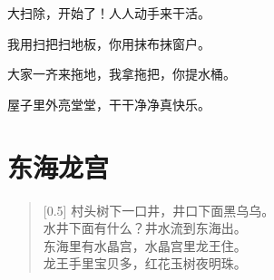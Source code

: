 \documentclass[12pt,UTF-8,openany]{ctexbook}
\begin{document}
\begin{large}
    
    大扫除，开始了！人人动手来干活。
    
    我用扫把扫地板，你用抹布抹窗户。
    
    大家一齐来拖地，我拿拖把，你提水桶。
    
    屋子里外亮堂堂，干干净净真快乐。
    
\end{large}


\clearpage

\begin{center}
    
    
\end{center}


\hanzibox{}\hanzibox{}\hanzibox{}\hanzibox{}\hspace{1em}\hanzibox{}\hanzibox{}\hanzibox{}\hanzibox{}

\hanzibox{}\hanzibox{}\hanzibox{}\hanzibox{}\hspace{1em}\hanzibox{}\hanzibox{}\hanzibox{}\hanzibox{}

\hanzibox{}\hanzibox{}\hanzibox{}\hanzibox{}\hspace{1em}\hanzibox{}\hanzibox{}\hanzibox{}\hanzibox{}

\hanzibox{}\hanzibox{}\hanzibox{}\hanzibox{}\hspace{1em}\hanzibox{}\hanzibox{}\hanzibox{}\hanzibox{}

\hanzibox{}\hanzibox{}\hanzibox{}\hanzibox{}\hspace{1em}\hanzibox{}\hanzibox{}\hanzibox{}\hanzibox{}






\chapter{东海龙宫}

\begin{large}
    
    \begin{verse}[0.5\linewidth]
        村头树下一口井，井口下面黑乌乌。 \\
        水井下面有什么？井水流到东海出。 \\
        东海里有水晶宫，水晶宫里龙王住。 \\
        龙王手里宝贝多，红花玉树夜明珠。
    \end{verse}
    
\end{large}
\end{document}

